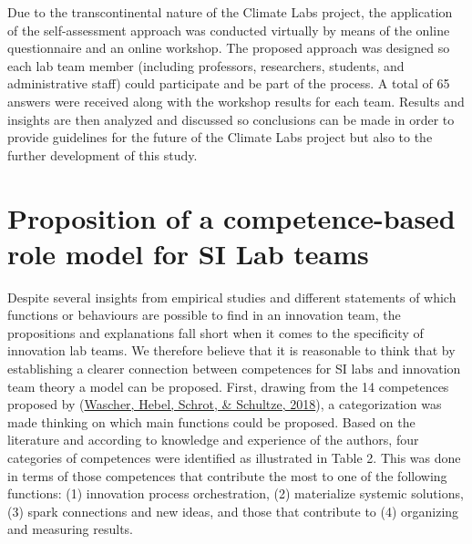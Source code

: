 \documentclass[]{elsarticle} %
\begin{document}
Due to the transcontinental nature of the Climate Labs project, the
application of the self-assessment approach was conducted virtually by
means of the online questionnaire and an online workshop. The proposed
approach was designed so each lab team member (including professors,
researchers, students, and administrative staff) could participate and
be part of the process. A total of 65 answers were received along with
the workshop results for each team. Results and insights are then
analyzed and discussed so conclusions can be made in order to provide
guidelines for the future of the Climate Labs project but also to the
further development of this study.

\hypertarget{proposition-of-a-competence-based-role-model-for-si-lab-teams}{%
\section{Proposition of a competence-based role model for SI Lab
teams}\label{proposition-of-a-competence-based-role-model-for-si-lab-teams}}

Despite several insights from empirical studies and different statements
of which functions or behaviours are possible to find in an innovation
team, the propositions and explanations fall short when it comes to the
specificity of innovation lab teams. We therefore believe that it is
reasonable to think that by establishing a clearer connection between
competences for SI labs and innovation team theory a model can be
proposed. First, drawing from the 14 competences proposed by
(\protect\hyperlink{ref-Wascher2018}{Wascher, Hebel, Schrot, \&
Schultze, 2018}), a categorization was made thinking on which main
functions could be proposed. Based on the literature and according to
knowledge and experience of the authors, four categories of competences
were identified as illustrated in Table 2. This was done in terms of
those competences that contribute the most to one of the following
functions: (1) innovation process orchestration, (2) materialize
systemic solutions, (3) spark connections and new ideas, and those that
contribute to (4) organizing and measuring results.

\providecommand{\docline}[3]{\noalign{\global\setlength{\arrayrulewidth}{#1}}\arrayrulecolor[HTML]{#2}\cline{#3}}

\setlength{\tabcolsep}{2pt}

\renewcommand*{\arraystretch}{1.5}
\end{document}
